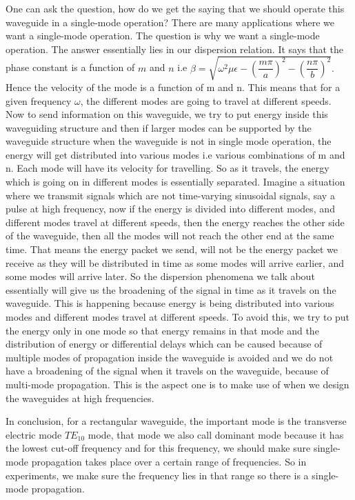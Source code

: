One can ask the question, how do we get the saying that we should operate this waveguide in a single-mode operation? There are many applications where we want a single-mode operation. The question is why we want a single-mode operation. The answer essentially lies in our dispersion relation. It says that the phase constant is a function of $m$ and $n$ i.e $\beta = \sqrt{{\omega}^2\mu\epsilon - \left(\dfrac{m\pi}{a}\right)^2 - \left(\dfrac{n\pi}{b}\right)^2}.$ Hence the velocity of the mode is a function of m and n. This means that for a given frequency $\omega$, the different modes are going to travel at different speeds. Now to send information on this waveguide, we try to put energy inside this waveguiding structure and then if larger modes can be supported by the waveguide structure when the waveguide is not in single mode operation, the energy will get distributed into various modes i.e various combinations of m and n. Each mode will have its velocity for travelling. So as it travels, the energy which is going on in different modes is essentially separated. Imagine a situation where we transmit signals which are not time-varying sinusoidal signals, say a pulse at high frequency, now if the energy is divided into different modes, and different modes travel at different speeds, then the energy reaches the other side of the waveguide, then all the modes will not reach the other end at the same time. That means the energy packet we send, will not be the energy packet we receive as they will be distributed in time as some modes will arrive earlier, and some modes will arrive later. So the dispersion phenomena we talk about essentially will give us the broadening of the signal in time as it travels on the waveguide. This is happening because energy is being distributed into various modes and different modes travel at different speeds. To avoid this, we try to put the energy only in one mode so that energy remains in that mode and the distribution of energy or differential delays which can be caused because of multiple modes of propagation inside the waveguide is avoided and we do not have a broadening of the signal when it travels on the waveguide, because of multi-mode propagation. This is the aspect one is to make use of when we design the waveguides at high frequencies.

In conclusion, for a rectangular waveguide, the important mode is the transverse electric mode $TE_{10}$ mode, that mode we also call dominant mode because it has the lowest cut-off frequency and for this frequency, we should make sure single-mode propagation takes place over a certain range of frequencies. So in experiments, we make sure the frequency lies in that range so there is a single-mode propagation.